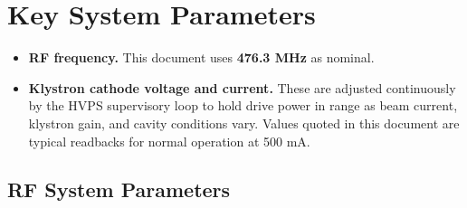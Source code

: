 

\section{Key System Parameters}\label{sec:key-parameters}

\begin{keynote}

\begin{itemize}
\tightlist
\item
  \textbf{RF frequency.} This document uses \textbf{476.3 MHz} as nominal. 
\item
  \textbf{Klystron cathode voltage and current.} These are adjusted continuously by the HVPS supervisory loop to hold drive power in range as beam current, klystron gain, and cavity conditions vary. Values quoted in this document are typical readbacks for normal operation at 500 mA.
\end{itemize}

\end{keynote}

\subsection{RF System Parameters}\label{sec:rf-parameters}

